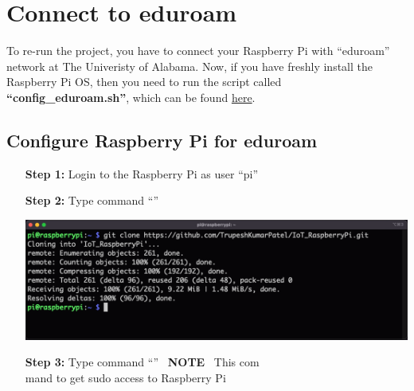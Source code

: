 \section{Connect to eduroam}	\label{sec:run-eduroam}
	 To re-run the project, you have to connect your Raspberry Pi with ``eduroam'' network at The Univeristy of Alabama. Now, if you have freshly install the Raspberry Pi OS, then you need to run the script called \textbf{``config\_eduroam.sh''}, which can be found \href{https://github.com/TrupeshKumarPatel/IoT_RaspberryPi/tree/main/source_code/eduroam_config}{here}. 
	 
\subsection{Configure Raspberry Pi for eduroam}
		\begin{itemize}[leftmargin=1.8cm]
			\item[\textbf{Step 1:}] Login to the Raspberry Pi as user ``pi'' %
			\item[\textbf{Step 2:}] Type command ``{\selectfont{git clone https://github\\.com/TrupeshKumarPatel/IoT\_RaspberryPi.\\git}}''\\
				\begin{minipage}{\textwidth}
					\vspace{2mm}
					\includegraphics[scale=0.17]{Images/raspberry_pi/eduroam_config/clone_git.png}
					\vspace{2mm}
				\end{minipage}
			\item[\textbf{Step 3:}] Type command ``{\selectfont{sudo su}}'' ~\danger\textbf{NOTE} ~This com\\mand to get sudo access to Raspberry Pi \danger\\
				\begin{minipage}{\textwidth}
					\vspace{2mm}

\end{minipage}
\end{itemize}
